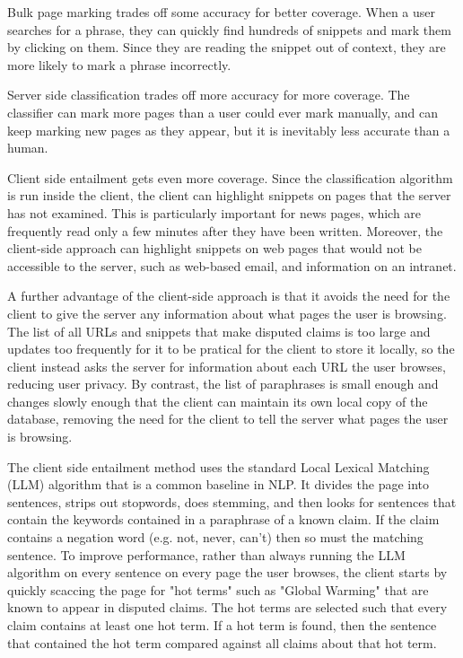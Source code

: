 \documentclass{www2010-submission}
\begin{document}
Bulk page marking trades off some accuracy for better coverage. When a user searches for a phrase, they can quickly find hundreds of snippets and mark them by clicking on them. Since they are reading the snippet out of context, they are more likely to mark a phrase incorrectly. 

Server side classification trades off more accuracy for more coverage. The classifier can mark more pages than a user could ever mark manually, and can keep marking new pages as they appear, but it is inevitably less accurate than a human.

Client side entailment gets even more coverage. Since the classification algorithm is run inside the client, the client can highlight snippets on pages that the server has not examined. This is particularly important for news pages, which are frequently read only a few minutes after they have been written. Moreover, the client-side approach can highlight snippets on web pages that would not be accessible to the server, such as web-based email, and information on an intranet. 

A further advantage of the client-side approach is that it avoids the need for the client to give the server any information about what pages the user is browsing. The list of all URLs and snippets that make disputed claims is too large and updates too frequently for it to be pratical for the client to store it locally, so the client instead asks the server for information about each URL the user browses, reducing user privacy. By contrast, the list of paraphrases is small enough and changes slowly enough that the client can maintain its own local copy of the database, removing the need for the client to tell the server what pages the user is browsing.

The client side entailment method uses the standard Local Lexical Matching (LLM) algorithm that is a common baseline in NLP. It divides the page into sentences, strips out stopwords, does stemming, and then looks for sentences that contain the keywords contained in a paraphrase of a known claim. If the claim contains a negation word (e.g. not, never, can't) then so must the matching sentence. To improve performance, rather than always running the LLM algorithm on every sentence on every page the user browses, the client starts by quickly scaccing the page for "hot terms" such as "Global Warming" that are known to appear in disputed claims. The hot terms are selected such that every claim contains at least one hot term. If a hot term is found, then the sentence that contained the hot term compared against all claims about that hot term.
\end{document}
